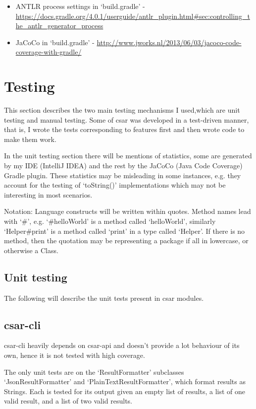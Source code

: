 \documentclass[12pt, letterpaper]{article}
\begin{document}
\begin{itemize}
  \item ANTLR process settings in `build.gradle' - \url{https://docs.gradle.org/4.0.1/userguide/antlr\_plugin.html\#sec:controlling\_the\_antlr\_generator\_process}
  \item JaCoCo in `build.gradle' - \url{http://www.jworks.nl/2013/06/03/jacoco-code-coverage-with-gradle/}
\end{itemize}

\section{Testing}
This section describes the two main testing mechanisms I used,which are unit testing and manual testing.
Some of csar was developed in a test-driven manner, that is, I wrote the tests corresponding to features first and then wrote code to make them work.

In the unit testing section there will be mentions of statistics, some are generated by my IDE (IntelliJ IDEA) and the rest by the JaCoCo (Java Code Coverage) Gradle plugin.
These statistics may be misleading in some instances, e.g. they account for the testing of `toString()' implementations which may not be interesting in most scenarios.

Notation: Language constructs will be written within quotes.
Method names lead with `\#', e.g. `\#helloWorld' is a method called `helloWorld', similarly `Helper\#print' is a method called `print' in a type called `Helper'.
If there is no method, then the quotation may be representing a package if all in lowercase, or otherwise a Class.

\subsection{Unit testing}
The following will describe the unit tests present in csar modules.

\subsection{csar-cli}
csar-cli heavily depends on csar-api and doesn't provide a lot behaviour of its own, hence it is not tested with high coverage.

The only unit tests are on the `ResultFormatter' subclasses `JsonResultFormatter' and `PlainTextResultFormatter', which format results as Strings.
Each is tested for its output given an empty list of results, a list of one valid result, and a list of two valid results.
\end{document}
